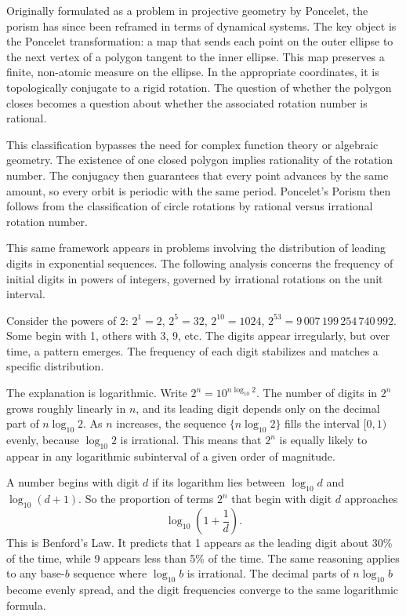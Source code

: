 Originally formulated as a problem in projective geometry by Poncelet, the porism has since been reframed in terms of dynamical systems. The key object is the Poncelet transformation: a map that sends each point on the outer ellipse to the next vertex of a polygon tangent to the inner ellipse. This map preserves a finite, non-atomic measure on the ellipse. In the appropriate coordinates, it is topologically conjugate to a rigid rotation. The question of whether the polygon closes becomes a question about whether the associated rotation number is rational.

This classification bypasses the need for complex function theory or algebraic geometry. The existence of one closed polygon implies rationality of the rotation number. The conjugacy then guarantees that every point advances by the same amount, so every orbit is periodic with the same period. Poncelet’s Porism then follows from the classification of circle rotations by rational versus irrational rotation number.

This same framework appears in problems involving the distribution of leading digits in exponential sequences. The following analysis concerns the frequency of initial digits in powers of integers, governed by irrational rotations on the unit interval.

Consider the powers of 2: $2^1 = 2$, $2^5 = 32$, $2^{10} = 1024$, $2^{53} = 9{\,}007{\,}199{\,}254{\,}740{\,}992$. Some begin with 1, others with 3, 9, etc. The digits appear irregularly, but over time, a pattern emerges. The frequency of each digit stabilizes and matches a specific distribution.

The explanation is logarithmic. Write $2^n = 10^{n \log_{10} 2}$. The number of digits in $2^n$ grows roughly linearly in $n$, and its leading digit depends only on the decimal part of $n \log_{10} 2$. As $n$ increases, the sequence $\{ n \log_{10} 2 \}$ fills the interval $[0,1)$ evenly, because $\log_{10} 2$ is irrational. This means that $2^n$ is equally likely to appear in any logarithmic subinterval of a given order of magnitude.

A number begins with digit $d$ if its logarithm lies between $\log_{10} d$ and $\log_{10}(d+1)$. So the proportion of terms $2^n$ that begin with digit $d$ approaches
\[
\log_{10}\left(1 + \frac{1}{d}\right).
\]
This is Benford’s Law. It predicts that 1 appears as the leading digit about 30\% of the time, while 9 appears less than 5\% of the time. The same reasoning applies to any base-$b$ sequence where $\log_{10} b$ is irrational. The decimal parts of $n \log_{10} b$ become evenly spread, and the digit frequencies converge to the same logarithmic formula.

